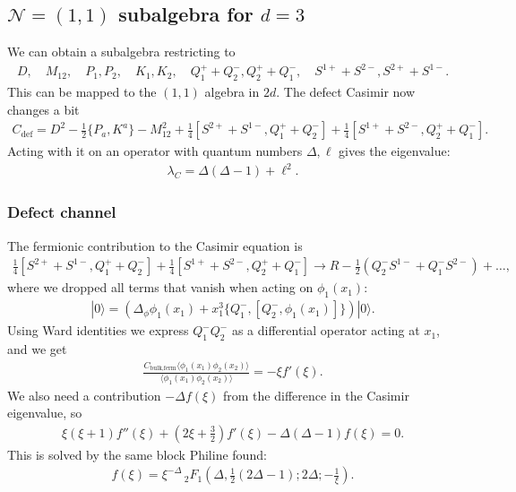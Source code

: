 \documentclass[letterpaper]{article}
\let\Oldsubsection\subsection
\renewcommand{\subsection}{\FloatBarrier\Oldsubsection}
\let\Oldsubsubsection\subsubsection
\renewcommand{\subsubsection}{\FloatBarrier\Oldsubsubsection}
\def\Nm{{\mathcal{N}}}
\begin{document}
\subsection{\texorpdfstring{$\Nm = (1, 1)$}{N=(1,1)} subalgebra
for \texorpdfstring{$d = 3$}{d=3}}

We can obtain a subalgebra restricting to
\begin{align}
 D, \quad
 M_{12}, \quad
 P_1, P_2, \quad
 K_1, K_2, \quad
 Q^+_1 + Q^-_2, Q^+_2 + Q^-_1, \quad
 S^{1+} + S^{2-}, S^{2+} + S^{1-}.
\end{align}
This can be mapped to the $(1,1)$ algebra in $2d$.
The defect Casimir now changes a bit
\begin{align}
 C_{\text{def}} = 
    D^2
  - \frac12 \{ P_{a}, K^{a} \}
  - M_{12}^2
  + \frac14 [ S^{2+} + S^{1-}, Q^+_1 + Q^-_2]
  + \frac14 [ S^{1+} + S^{2-}, Q^+_2 + Q^-_1].
\end{align}
Acting with it on an operator with quantum numbers $\Delta, \ell$ gives the eigenvalue:
\begin{align}
 \lambda_C 
 = \Delta (\Delta - 1)
 + \ell^2.
\end{align}


\subsubsection{Defect channel}

The fermionic contribution to the Casimir equation is
\begin{align}
    \frac14 [ S^{2+} + S^{1-}, Q^+_1 + Q^-_2]
  + \frac14 [ S^{1+} + S^{2-}, Q^+_2 + Q^-_1]
  \to R - \frac{1}{2} \left( 
    Q_2^- S^{1-} + Q_1^- S^{2-}
  \right) + \ldots,
\end{align}
where we dropped all terms that vanish when acting on $\phi_1(x_1)$:
\begin{align}
 [C_{\text{def,ferm}}, \phi_1(x_1)] |0\rangle 
 = \left( \Delta_\phi \phi_1(x_1) + x_1^3 \{ Q_1^-, [Q_2^-, \phi_1(x_1)]\} \right)|0\rangle.
\end{align}
Using Ward identities we express $Q_1^- Q_2^-$ as a differential operator acting at $x_1$, and we get
\begin{align}
 \frac{C_{\text{bulk,ferm}} \langle \phi_1(x_1) \phi_2(x_2) \rangle}
      {\langle \phi_1(x_1) \phi_2(x_2) \rangle}
 = -\xi  f'(\xi).
\end{align}
We also need a contribution $-\Delta f(\xi)$ from the difference in the Casimir eigenvalue, so
\begin{align}
   \xi  (\xi +1) f''(\xi )
 + \left(2 \xi +\frac{3}{2}\right) f'(\xi )
 - \Delta  (\Delta -1)f(\xi )
 = 0.
\end{align}
This is solved by the same block Philine found:
\begin{align}
 f(\xi) 
 = \xi ^{-\Delta } \, _2F_1\left(\Delta ,\frac{1}{2} (2 \Delta -1);2 \Delta ;-\frac{1}{\xi }\right).
\end{align}
\end{document}
